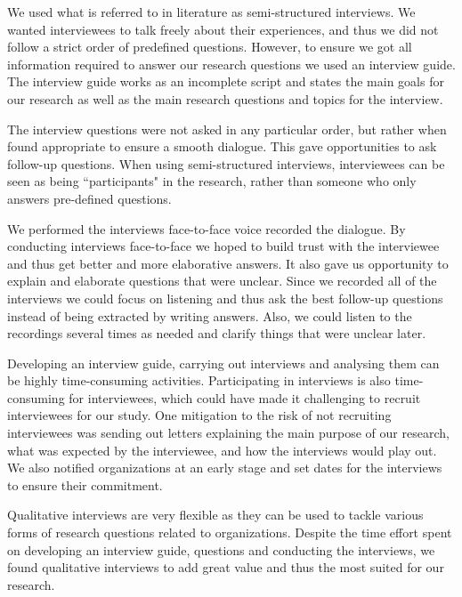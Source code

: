 We used what is referred to in literature as semi-structured interviews\cite{cassell2004essential}. We wanted interviewees to talk freely about their experiences, and thus we did not follow a strict order of predefined questions. However, to ensure we got all information required to answer our research questions we used an interview guide. The interview guide works as an incomplete script and states the main goals for our research as well as the main research questions and topics for the interview.

The interview questions were not asked in any particular order, but rather when found appropriate to ensure a smooth dialogue. This gave opportunities to ask follow-up questions. When using semi-structured interviews, interviewees can be seen as being ``participants" in the research, rather than someone who only answers pre-defined questions.

We performed the interviews face-to-face voice recorded the dialogue. By conducting interviews face-to-face we hoped to build trust with the interviewee and thus get better and more elaborative answers. It also gave us opportunity to explain and elaborate questions that were unclear. Since we recorded all of the interviews we could focus on listening and thus ask the best follow-up questions instead of being extracted by writing answers. Also, we could listen to the recordings several times as needed and clarify things that were unclear later.

Developing an interview guide, carrying out interviews and analysing them can be highly time-consuming activities. Participating in interviews is also time-consuming for interviewees, which could have made it challenging to recruit interviewees for our study. One mitigation to the risk of not recruiting interviewees was sending out letters explaining the main purpose of our research, what was expected by the interviewee, and how the interviews would play out. We also notified organizations at an early stage and set dates for the interviews to ensure their commitment.

Qualitative interviews are very flexible as they can be used to tackle various forms of research questions related to organizations. Despite the time effort spent on developing an interview guide, questions and conducting the interviews, we found qualitative interviews to add great value and thus the most suited for our research.

